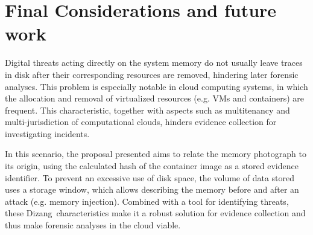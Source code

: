 \documentclass[conference]{IEEEtran}
\newcommand{\fancyname}{Dizang}
\begin{document}
%



\section{Final Considerations and future work}
\label{sec:conclusion}

Digital threats acting directly on the system memory do not usually leave traces in disk after their corresponding resources are removed, hindering later forensic analyses.
%
This problem is especially notable in cloud computing systems, in which the allocation and removal of virtualized resources (e.g. VMs and containers) are frequent.
%
This characteristic, together with aspects such as multitenancy and multi-jurisdiction of computational clouds, hinders evidence collection for investigating incidents.


In this scenario, the proposal presented aims to relate the memory photograph to its origin, using the calculated hash of the container image as a stored evidence identifier.
%
To prevent an excessive use of disk space, the volume of data stored uses a storage window, which allows describing the memory before and after an attack (e.g. memory injection).
%
Combined with a tool for identifying threats, these \fancyname\ characteristics make it a robust solution for evidence collection and thus make forensic analyses in the cloud viable.
\end{document}
